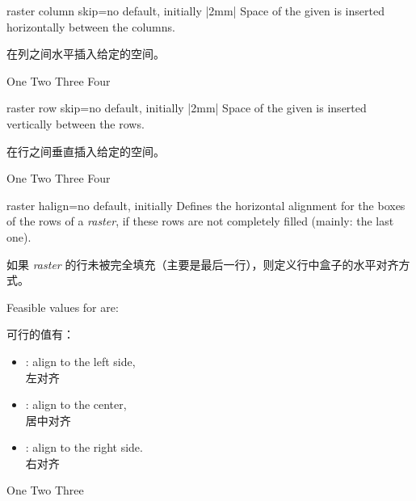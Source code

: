 \enlargethispage*{1cm}

\begin{docTcbKey}[][doc new=2014-11-10]{raster column skip}{=}{no default, initially |2mm|}
Space of the given  is inserted horizontally between the columns.

在列之间水平插入给定的空间。
\begin{dispExample}
\begin{tcbitemize}[raster column skip=2cm,
size=small,colframe=red!50!black,colback=red!10!white]
\tcbitem One
\tcbitem Two
\tcbitem Three
\tcbitem Four
\end{tcbitemize}
\end{dispExample}
\end{docTcbKey}

\begin{docTcbKey}[][doc new=2014-11-10]{raster row skip}{=}{no default, initially |2mm|}
Space of the given  is inserted vertically between the rows.

在行之间垂直插入给定的空间。
\begin{dispExample}
\begin{tcbitemize}[raster row skip=0pt,
size=small,colframe=red!50!black,colback=red!10!white]
\tcbitem One
\tcbitem Two
\tcbitem Three
\tcbitem Four
\end{tcbitemize}
\end{dispExample}
\end{docTcbKey}


\begin{docTcbKey}[][doc new=2014-11-10]{raster halign}{=}{no default, initially }
Defines the horizontal alignment for the boxes of the rows of a \emph{raster},
if these rows are not completely filled (mainly: the last one).

如果 \emph{raster} 的行未被完全填充（主要是最后一行），则定义行中盒子的水平对齐方式。

Feasible values for  are:

 可行的值有：
\begin{itemize}
\item{}: align to the left side,\\左对齐
\item{}: align to the center,\\居中对齐
\item{}: align to the right side.\\右对齐
\end{itemize}

\begin{dispExample}
\begin{tcbitemize}[raster halign=center,
size=small,colframe=red!50!black,colback=red!10!white]
\tcbitem One
\tcbitem Two
\tcbitem Three
\end{tcbitemize}
\end{dispExample}
\end{docTcbKey}


